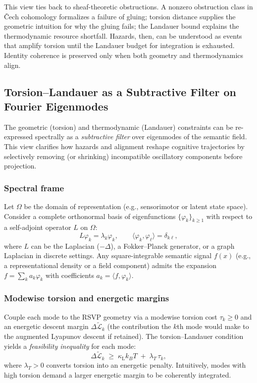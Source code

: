 \documentclass[a4paper,11pt]{article}
\begin{document}
This view ties back to sheaf-theoretic obstructions. A nonzero obstruction
class in Čech cohomology formalizes a failure of gluing; torsion distance
supplies the geometric intuition for why the gluing fails; the Landauer bound
explains the thermodynamic resource shortfall. Hazards, then, can be
understood as events that amplify torsion until the Landauer budget for
integration is exhausted. Identity coherence is preserved only when both
geometry and thermodynamics align.

\subsection{Torsion--Landauer as a Subtractive Filter on Fourier Eigenmodes}
\label{sec:spectral-filter}

The geometric (torsion) and thermodynamic (Landauer) constraints can be
re-expressed spectrally as a \emph{subtractive filter} over eigenmodes of the
semantic field. This view clarifies how hazards and alignment reshape cognitive
trajectories by selectively removing (or shrinking) incompatible oscillatory
components before projection.

\subsubsection{Spectral frame}
Let $\Omega$ be the domain of representation (e.g., sensorimotor or latent
state space). Consider a complete orthonormal basis of eigenfunctions
$\{\varphi_k\}_{k\ge1}$ with respect to a self-adjoint operator $L$ on $\Omega$:
\begin{equation}
L\varphi_k=\lambda_k \varphi_k,\qquad
\langle \varphi_k,\varphi_\ell\rangle=\delta_{k\ell},
\end{equation}
where $L$ can be the Laplacian ($-\Delta$), a Fokker--Planck generator, or a
graph Laplacian in discrete settings. Any square-integrable semantic signal
$f(x)$ (e.g., a representational density or a field component) admits the
expansion $f=\sum_k a_k \varphi_k$ with coefficients $a_k=\langle f,\varphi_k\rangle$.

\subsubsection{Modewise torsion and energetic margins}
Couple each mode to the RSVP geometry via a modewise torsion cost $\tau_k\ge0$
and an energetic descent margin $\Delta\widetilde{\mathcal{L}}_k$ (the
contribution the $k$th mode would make to the augmented Lyapunov descent if
retained). The torsion--Landauer condition yields a \emph{feasibility inequality}
for each mode:
\begin{equation}
\label{eq:mode-feasibility}
\Delta\widetilde{\mathcal{L}}_k \;\ge\; \kappa_{\mathrm L} k_B T \;+\; \lambda_T\,\tau_k,
\end{equation}
where $\lambda_T>0$ converts torsion into an energetic penalty. Intuitively,
modes with high torsion demand a larger energetic margin to be coherently
integrated.
\end{document}
